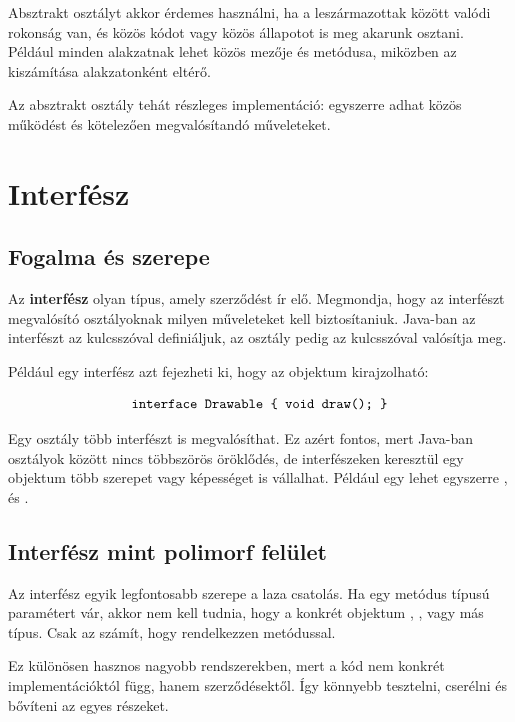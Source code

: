 Absztrakt osztályt akkor érdemes használni, ha a leszármazottak között valódi rokonság van, és közös kódot vagy közös állapotot is meg akarunk osztani. Például minden  alakzatnak lehet közös  mezője és  metódusa, miközben az  kiszámítása alakzatonként eltérő.

Az absztrakt osztály tehát részleges implementáció: egyszerre adhat közös működést és kötelezően megvalósítandó műveleteket.

\section{Interfész}

\subsection{Fogalma és szerepe}

Az \textbf{interfész} olyan típus, amely szerződést ír elő. Megmondja, hogy az interfészt megvalósító osztályoknak milyen műveleteket kell biztosítaniuk. Java-ban az interfészt az  kulcsszóval definiáljuk, az osztály pedig az  kulcsszóval valósítja meg.

Például egy  interfész azt fejezheti ki, hogy az objektum kirajzolható:

\[
  \texttt{interface Drawable \{ void draw(); \}}
\]

Egy osztály több interfészt is megvalósíthat. Ez azért fontos, mert Java-ban osztályok között nincs többszörös öröklődés, de interfészeken keresztül egy objektum több szerepet vagy képességet is vállalhat. Például egy  lehet egyszerre ,  és .

\subsection{Interfész mint polimorf felület}

Az interfész egyik legfontosabb szerepe a laza csatolás. Ha egy metódus  típusú paramétert vár, akkor nem kell tudnia, hogy a konkrét objektum , ,  vagy más típus. Csak az számít, hogy rendelkezzen  metódussal.

Ez különösen hasznos nagyobb rendszerekben, mert a kód nem konkrét implementációktól függ, hanem szerződésektől. Így könnyebb tesztelni, cserélni és bővíteni az egyes részeket.

